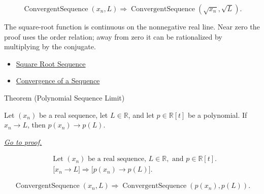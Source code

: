 \begin{remark*}
\[
\operatorname{ConvergentSequence}(x_n,L)
\Longrightarrow
\operatorname{ConvergentSequence}(\sqrt{x_n},\sqrt{L}).
\]
\end{remark*}

\begin{remark*}[Interpretation]
The square-root function is continuous on the nonnegative real line. Near
zero the proof uses the order relation; away from zero it can be rationalized
by multiplying by the conjugate.
\end{remark*}

\begin{dependencies}
\begin{itemize}
  \item \hyperref[def:square-root-sequence]{Square Root Sequence}
  \item \hyperref[def:convergent-sequence]{Convergence of a Sequence}
\end{itemize}
\end{dependencies}


\begin{theorembox}{Theorem (Polynomial Sequence Limit)}
\begin{theorem}
\label{thm:polynomial-sequence-limit}
Let $(x_n)$ be a real sequence, let $L\in\mathbb{R}$, and let
$p\in\mathbb{R}[t]$ be a polynomial. If $x_n\to L$, then
$p(x_n)\to p(L)$.

\smallskip
\noindent
\hyperref[prf:polynomial-sequence-limit]{\textit{Go to proof.}}
\end{theorem}
\end{theorembox}

\begin{remark*}
\[
\begin{aligned}
&\text{Let } (x_n) \text{ be a real sequence, } L\in\mathbb{R},
  \text{ and } p\in\mathbb{R}[t].\\
&\bigl[x_n\to L\bigr]
\Longrightarrow
\bigl[p(x_n)\to p(L)\bigr].
\end{aligned}
\]
\end{remark*}

\begin{remark*}
\[
\operatorname{ConvergentSequence}(x_n,L)
\Longrightarrow
\operatorname{ConvergentSequence}(p(x_n),p(L)).
\]
\end{remark*}

